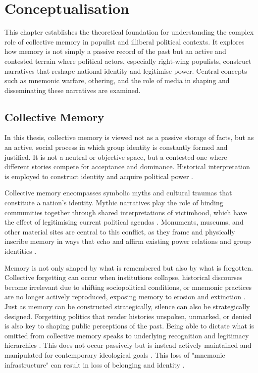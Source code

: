 \chapter[Conceptualization]{Conceptualisation}
\label{Chap:Conceptualisation}

This chapter establishes the theoretical foundation for understanding the complex role of collective memory in populist and illiberal political contexts. It explores how memory is not simply a passive record of the past but an active and contested terrain where political actors, especially right-wing populists, construct narratives that reshape national identity and legitimise power. Central concepts such as mnemonic warfare, othering, and the role of media in shaping and disseminating these narratives are examined.

\section{Collective Memory}

In this thesis, collective memory is viewed not as a passive storage of facts, but as an active, social process in which group identity is constantly formed and justified. It is not a neutral or objective space, but a contested one where different stories compete for acceptance and dominance. Historical interpretation is employed to construct identity and acquire political power \citep{kapralski_battlefields_2001}.

Collective memory encompasses symbolic myths and cultural traumas that constitute a nation's identity. Mythic narratives play the role of binding communities together through shared interpretations of victimhood, which have the effect of legitimising current political agendas \citep{stanczyk_commemorating_2014}. Monuments, museums, and other material sites are central to this conflict, as they frame and physically inscribe memory in ways that echo and affirm existing power relations and group identities \citep{kapralski_battlefields_2001}.

Memory is not only shaped by what is remembered but also by what is forgotten. Collective forgetting can occur when institutions collapse, historical discourses become irrelevant due to shifting sociopolitical conditions, or mnemonic practices are no longer actively reproduced, exposing memory to erosion and extinction \citep{foroughi_collective_2020}. Just as memory can be constructed strategically, silence can also be strategically designed. Forgetting politics that render histories unspoken, unmarked, or denied is also key to shaping public perceptions of the past. Being able to dictate what is omitted from collective memory speaks to underlying recognition and legitimacy hierarchies \citep{vinitzky-seroussi_unpacking_2010}. This does not occur passively but is instead actively maintained and manipulated for contemporary ideological goals \citep{stanczyk_commemorating_2014}. This loss of "mnemonic infrastructure" can result in loss of belonging and identity \citep{foroughi_collective_2020}.


